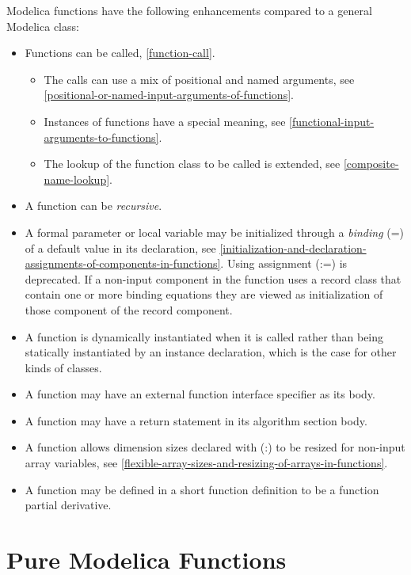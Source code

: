\documentclass[10pt,a4paper]{report}
\def\doublelabel#1{\label{#1}\hypertarget{#1}{}}
\begin{document}
Modelica functions have the following enhancements compared to a general
Modelica class:

\begin{itemize}
\item
  Functions can be called, \ref{function-call}.

  \begin{itemize}
  \item
    The calls can use a mix of positional and named arguments, see
    \ref{positional-or-named-input-arguments-of-functions}.
  \item
    Instances of functions have a special meaning, see \ref{functional-input-arguments-to-functions}.
  \item
    The lookup of the function class to be called is extended, see
    \ref{composite-name-lookup}.
  \end{itemize}
\item
  A function can be \emph{recursive}.
\item
  A formal parameter or local variable may be initialized through a
  \emph{binding} (=) of a default value in its declaration, 
  see \ref{initialization-and-declaration-assignments-of-components-in-functions}.
  Using assignment (:=) is deprecated. If a non-input component in the
  function uses a record class that contain one or more binding
  equations they are viewed as initialization of those component of the
  record component.
\item
  A function is dynamically instantiated when it is called rather than
  being statically instantiated by an instance declaration, which is the
  case for other kinds of classes.
\item
  A function may have an external function interface specifier as its
  body.
\item
  A function may have a return statement in its algorithm section body.
\item
  A function allows dimension sizes declared with (:) to be resized for
  non-input array variables, see \ref{flexible-array-sizes-and-resizing-of-arrays-in-functions}.
\item
  A function may be defined in a short function definition to be a
  function partial derivative.
\end{itemize}

\section{Pure Modelica Functions}\doublelabel{pure-modelica-functions}
\end{document}
